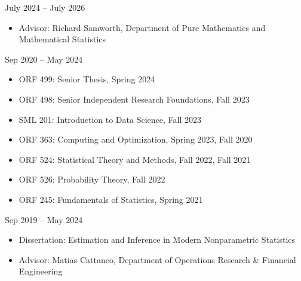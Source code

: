 \documentclass{wgu-cv}
\begin{document}
\maketitle


{July 2024 -- July 2026}

\begin{itemize}
  \item Advisor:
    Richard Samworth, Department of Pure Mathematics
    and Mathematical Statistics
\end{itemize}

{Sep 2020 -- May 2024}

\begin{itemize}

  \item
    ORF 499:
    Senior Thesis,
    Spring 2024

  \item
    ORF 498:
    Senior Independent Research Foundations,
    Fall 2023

  \item
    SML 201:
    Introduction to Data Science,
    Fall 2023

  \item
    ORF 363:
    Computing and Optimization,
    Spring 2023, Fall 2020

  \item
    ORF 524:
    Statistical Theory and Methods,
    Fall 2022, Fall 2021

  \item
    ORF 526:
    Probability Theory,
    Fall 2022

  \item
    ORF 245:
    Fundamentals of Statistics,
    Spring 2021

\end{itemize}


{Sep 2019 -- May 2024}

\begin{itemize}
  \item Dissertation:
    Estimation and Inference in Modern Nonparametric Statistics
  \item Advisor:
    Matias Cattaneo, Department of Operations Research \& Financial Engineering
\end{itemize}
\end{document}
